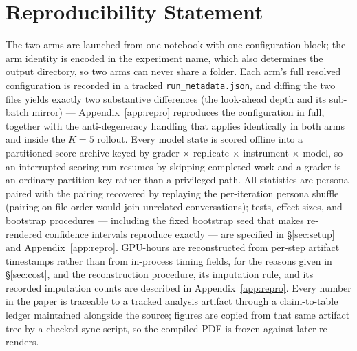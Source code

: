 \section*{Reproducibility Statement}

The two arms are launched from one notebook with one configuration block; the arm identity is
encoded in the experiment name, which also determines the output directory, so two arms can never
share a folder. Each arm's full resolved configuration is recorded in a tracked
\texttt{run\_metadata.json}, and diffing the two files yields exactly two substantive differences
(the look-ahead depth and its sub-batch mirror) --- Appendix~\ref{app:repro} reproduces the
configuration in full, together with the anti-degeneracy handling that applies identically in both
arms and inside the $K{=}5$ rollout. Every model state is scored offline into a partitioned score
archive keyed by grader $\times$ replicate $\times$ instrument $\times$ model, so an interrupted
scoring run resumes by skipping completed work and a grader is an ordinary partition key rather
than a privileged path. All statistics are persona-paired with the pairing recovered by replaying
the per-iteration persona shuffle (pairing on file order would join unrelated conversations);
tests, effect sizes, and bootstrap procedures --- including the fixed bootstrap seed that makes
re-rendered confidence intervals reproduce exactly --- are specified in \S\ref{sec:setup} and
Appendix~\ref{app:repro}. GPU-hours are reconstructed from per-step artifact timestamps rather
than from in-process timing fields, for the reasons given in \S\ref{sec:cost}, and the
reconstruction procedure, its imputation rule, and its recorded imputation counts are described in
Appendix~\ref{app:repro}. Every number in the paper is traceable to a tracked analysis artifact
through a claim-to-table ledger maintained alongside the source; figures are copied from that same
artifact tree by a checked sync script, so the compiled PDF is frozen against later re-renders.
